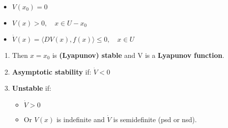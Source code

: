  \begin{tcolorbox}
 \begin{itemize}
    \item $V(x_0)=0$
    \item $V(x)>0, \quad x\in U-{x_0}$
    \item $\dot{V}(x)=\langle DV(x), f(x)\rangle\leq 0, \quad x\in U$ 
 \end{itemize}
 \end{tcolorbox}
 
 \begin{enumerate}
     \item  Then $x=x_0$ is \textbf{(Lyapunov) stable} and V is a \textbf{Lyapunov function}.
     \item \textbf{Asymptotic stability} if: $\dot{V}<0$
     \item \textbf{Unstable} if: 
     \begin{itemize}
         \item $\dot{V}>0$
         \item Or $V(x)$ is indefinite and $\dot{V}$ is semidefinite (psd or nsd). 
     \end{itemize}
 \end{enumerate}
